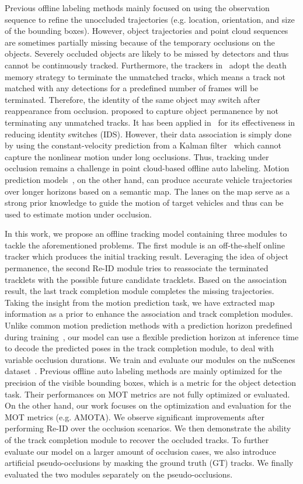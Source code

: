 \documentclass{article} \usepackage{iclr2023_conference,times}
\begin{document}
 Previous offline labeling methods mainly focused on using the observation sequence to refine the unoccluded trajectories (e.g. location, orientation, and size of the bounding boxes). However, object trajectories and point cloud sequences are sometimes partially missing because of the temporary occlusions on the objects. Severely occluded objects are likely to be missed by detectors and thus cannot be continuously tracked. Furthermore, the trackers in~\cite{Auto4d,offboard_labeling} adopt the death memory strategy to terminate the unmatched tracks, which means a track not matched with any detections for a predefined number of frames will be terminated. Therefore, the identity of the same object may switch after reappearance from occlusion. \cite{Immortaltrackers} proposed to capture object permanence by not terminating any unmatched tracks. It has been applied in~\cite{CTRL, Detzero} for its effectiveness in reducing identity switches (IDS). However, their data association is simply done by using the constant-velocity prediction from a Kalman filter~\cite{kalman_filter} which cannot capture the nonlinear motion under long occlusions. Thus, tracking under occlusion remains a challenge in point cloud-based offline auto labeling. 
Motion prediction models~\cite{laneGCN, gao2020vectornet}, on the other hand, can produce accurate vehicle trajectories over longer horizons based on a semantic map. The lanes on the map serve as a strong prior knowledge to guide the motion of target vehicles and thus can be used to estimate motion under occlusion.


In this work, we propose an offline tracking model containing three modules to tackle the aforementioned problems. The first module is an off-the-shelf online tracker which produces the initial tracking result. Leveraging the idea of object permanence, the second Re-ID module tries to reassociate the terminated tracklets with the possible future candidate tracklets. 
Based on the association result, the last track completion module completes the missing trajectories. Taking the insight from the motion prediction task, we have extracted map information as a prior to enhance the association and track completion modules. Unlike common motion prediction methods with a prediction horizon predefined during training~\cite{PGP, HOME}, our model can use a flexible prediction horizon at inference time to decode the predicted poses in the track completion module, to deal with variable occlusion durations. 
We train and evaluate our modules on the nuScenes dataset~\cite{nuscenes}. Previous offline auto labeling methods are mainly optimized for the precision of the visible bounding boxes, which is a metric for the object detection task. Their performances on MOT metrics are not fully optimized or evaluated. On the other hand, our work focuses on the optimization and evaluation for the MOT metrics (e.g. AMOTA). We observe significant improvements after performing Re-ID over the occlusion scenarios. We then demonstrate the ability of the track completion module to recover the occluded tracks.
To further evaluate our model on a larger amount of occlusion cases, we also introduce artificial pseudo-occlusions by masking the ground truth (GT) tracks.
We finally evaluated the two modules separately on the pseudo-occlusions. 
\end{document}

